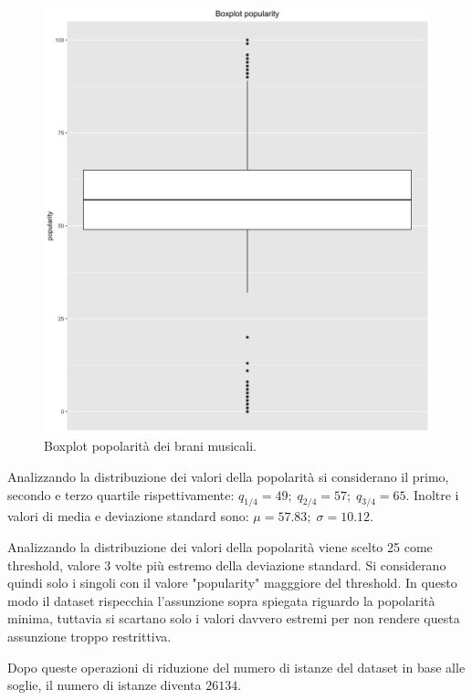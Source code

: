 \begin{figure}[H]
\centering
\includegraphics[width=14cm]{../images/popularity_boxplot.png}
\caption{Boxplot popolarità dei brani musicali.}
\end{figure}


Analizzando la distribuzione dei valori della popolarità si
considerano il primo, secondo e terzo quartile rispettivamente:
$q_{1/4} = 49; \; q_{2/4}= 57; \; q_{3/4} = 65$. Inoltre i valori di
media e deviazione standard sono: $\mu = 57.83; \; \sigma = 10.12$.

Analizzando la distribuzione dei valori della popolarità viene scelto
25 come threshold, valore 3 volte più estremo della deviazione
standard. Si considerano quindi solo i singoli con il valore
"popularity" magggiore del threshold. In questo modo il dataset
rispecchia l'assunzione sopra spiegata riguardo la popolarità minima,
tuttavia si scartano solo i valori davvero estremi per non rendere
questa assunzione troppo restrittiva.

Dopo queste operazioni di riduzione del numero di istanze del dataset
in base alle soglie, il numero di istanze diventa $26134$.

